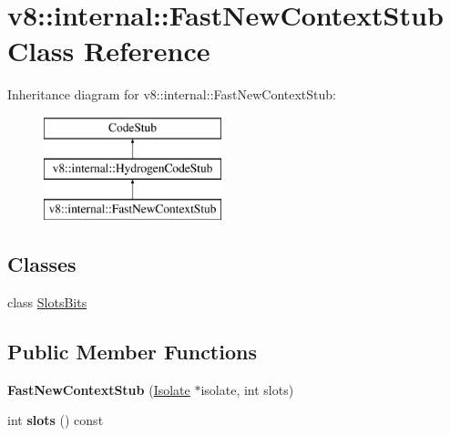 \hypertarget{classv8_1_1internal_1_1_fast_new_context_stub}{}\section{v8\+:\+:internal\+:\+:Fast\+New\+Context\+Stub Class Reference}
\label{classv8_1_1internal_1_1_fast_new_context_stub}
Inheritance diagram for v8\+:\+:internal\+:\+:Fast\+New\+Context\+Stub\+:\begin{figure}[H]
\begin{center}
\leavevmode
\includegraphics[height=3.000000cm]{classv8_1_1internal_1_1_fast_new_context_stub}
\end{center}
\end{figure}
\subsection*{Classes}
\begin{DoxyCompactItemize}
\item 
class \hyperlink{classv8_1_1internal_1_1_fast_new_context_stub_1_1_slots_bits}{Slots\+Bits}
\end{DoxyCompactItemize}
\subsection*{Public Member Functions}
\begin{DoxyCompactItemize}
\item 
{\bfseries Fast\+New\+Context\+Stub} (\hyperlink{classv8_1_1internal_1_1_isolate}{Isolate} $\ast$isolate, int slots)\hypertarget{classv8_1_1internal_1_1_fast_new_context_stub_a6c3f1473350a91372111dbcbadaeb556}{}\label{classv8_1_1internal_1_1_fast_new_context_stub_a6c3f1473350a91372111dbcbadaeb556}

\item 
int {\bfseries slots} () const \hypertarget{classv8_1_1internal_1_1_fast_new_context_stub_a56b5fc9251e152249dbbf9c68f0415ca}{}\label{classv8_1_1internal_1_1_fast_new_context_stub_a56b5fc9251e152249dbbf9c68f0415ca}

\end{DoxyCompactItemize}
